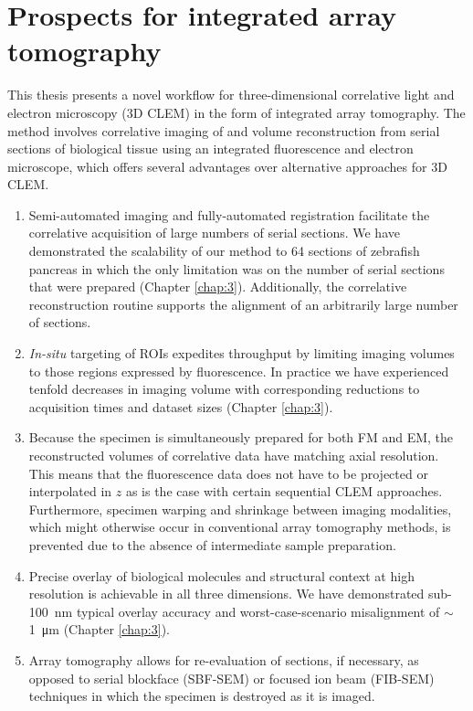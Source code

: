 \section{Prospects for integrated array tomography}
\label{sec:5.1_valorisation}

This thesis presents a novel workflow for three-dimensional correlative light and electron microscopy (3D CLEM) in the form of integrated array tomography. The method involves correlative imaging of and volume reconstruction from serial sections of biological tissue using an integrated fluorescence and electron microscope, which offers several advantages over alternative approaches for 3D CLEM.

\begin{enumerate}[label=(\Roman*)]
    \item Semi-automated imaging and fully-automated registration facilitate the correlative acquisition of large numbers of serial sections. We have demonstrated the scalability of our method to 64 sections of zebrafish pancreas in which the only limitation was on the number of serial sections that were prepared (Chapter \ref{chap:3}). Additionally, the correlative reconstruction routine supports the alignment of an arbitrarily large number of sections.
    \item \textit{In-situ} targeting of ROIs expedites throughput by limiting imaging volumes to those regions expressed by fluorescence. In practice we have experienced tenfold decreases in imaging volume with corresponding reductions to acquisition times and dataset sizes (Chapter \ref{chap:3}).
    \item Because the specimen is simultaneously prepared for both FM and EM, the reconstructed volumes of correlative data have matching axial resolution. This means that the fluorescence data does not have to be projected or interpolated in $z$ as is the case with certain sequential CLEM approaches. Furthermore, specimen warping and shrinkage between imaging modalities, which might otherwise occur in conventional array tomography methods, is prevented due to the absence of intermediate sample preparation.
    \item Precise overlay of biological molecules and structural context at high resolution is achievable in all three dimensions. We have demonstrated sub-\SI{100}{\nano\meter} typical overlay accuracy and worst-case-scenario misalignment of ${\sim}$\SI{1}{\micro\meter} (Chapter \ref{chap:3}).
    \item Array tomography allows for re-evaluation of sections, if necessary, as opposed to serial blockface (SBF-SEM) or focused ion beam (FIB-SEM) techniques in which the specimen is destroyed as it is imaged.
\end{enumerate}

